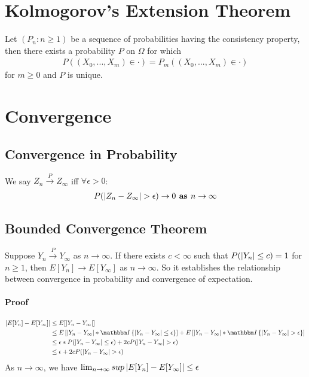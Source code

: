 \section{Kolmogorov's Extension Theorem} 
Let $(P_n : n \geq 1)$ be a sequence of probabilities having the consistency property, then there exists a probability $P$ on $\Omega$ for which 
    \begin{align*}
        P((X_0, ..., X_m) \in \cdot) = P_m((X_0, ..., X_m) \in \cdot)
    \end{align*}
for $m \geq 0$ and $P$ is unique. 



\section{Convergence} 


\subsection{Convergence in Probability} 
We say $Z_n \overset{P}{\to} Z_\infty$ iff $\forall \epsilon >0$: 
    \begin{align*}
        P(\left| Z_n  - Z_\infty \right| > \epsilon) \to 0 \textbf{ as } n \to \infty
    \end{align*}


\subsection{Bounded Convergence Theorem}
Suppose $Y_n \overset{P}{\to} Y_\infty$ as $n \to \infty$. If there exists $c < \infty$ such that $P(\left| Y_n \right| \leq c) = 1$ for $n \geq 1$, then $E[Y_n] \to E[Y_\infty]$ as $n \to \infty$. So it establishes the relationship between convergence in probability and convergence of expectation. 

\paragraph{Proof}
\begin{align*}
    \abs{E[Y_n] - E[Y_\infty]} 
    & \leq E[\abs{Y_n - Y_\infty}] \\
    & \leq E\left[\abs{Y_n - Y_\infty}* \indic{\abs{Y_n - Y_\infty} \leq \epsilon} \right]   + E\left[\abs{Y_n - Y_\infty}* \indic{\abs{Y_n - Y_\infty} > \epsilon} \right] \\
    & \leq \epsilon * P(\abs{Y_n - Y_\infty} \leq \epsilon) + 2c P(\abs{Y_n - Y_\infty} > \epsilon)\\
    & \leq \epsilon +  2c P(\abs{Y_n - Y_\infty} > \epsilon)\\
\end{align*}
As $n \to \infty$, we have $\lim_{n\to \infty} sup \left| E[Y_n] - E[Y_\infty] \right| \leq \epsilon$


